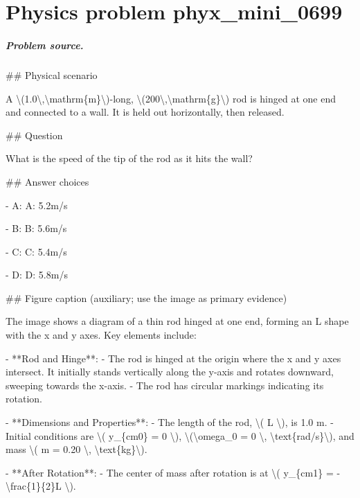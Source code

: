 
\chapter{Physics problem phyx\_mini\_0699}
\label{ch:PhyXMiniProblems_problem_phyx_mini_0699}

\paragraph{Problem source.}
\#\# Physical scenario

A \textbackslash{}(1.0\textbackslash{},\textbackslash{}mathrm\{m\}\textbackslash{})-long, \textbackslash{}(200\textbackslash{},\textbackslash{}mathrm\{g\}\textbackslash{}) rod is hinged at one end and connected to a wall. It is held out horizontally, then released.

\#\# Question

What is the speed of the tip of the rod as it hits the wall?

\#\# Answer choices

- A: A: 5.2m/s

- B: B: 5.6m/s

- C: C: 5.4m/s

- D: D: 5.8m/s

\#\# Figure caption (auxiliary; use the image as primary evidence)

The image shows a diagram of a thin rod hinged at one end, forming an L shape with the x and y axes. Key elements include:

- **Rod and Hinge**: 
  - The rod is hinged at the origin where the x and y axes intersect. It initially stands vertically along the y-axis and rotates downward, sweeping towards the x-axis.
  - The rod has circular markings indicating its rotation.

- **Dimensions and Properties**:
  - The length of the rod, \textbackslash{}( L \textbackslash{}), is 1.0 m.
  - Initial conditions are \textbackslash{}( y\_\{cm0\} = 0 \textbackslash{}), \textbackslash{}(\textbackslash{}omega\_0 = 0 \textbackslash{}, \textbackslash{}text\{rad/s\}\textbackslash{}), and mass \textbackslash{}( m = 0.20 \textbackslash{}, \textbackslash{}text\{kg\}\textbackslash{}).

- **After Rotation**:
  - The center of mass after rotation is at \textbackslash{}( y\_\{cm1\} = -\textbackslash{}frac\{1\}\{2\}L \textbackslash{}).

